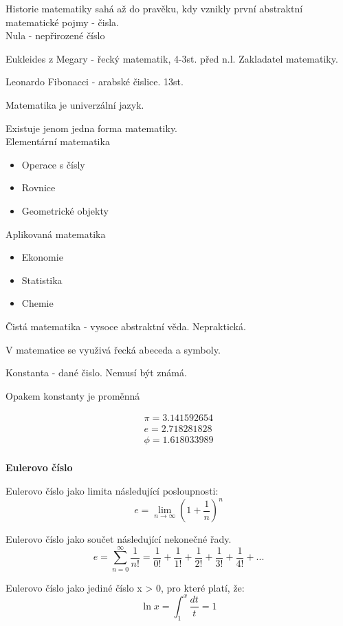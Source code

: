 \documentclass[a4paper,12pt]{article}
\begin{document}
Historie matematiky sahá až do pravěku, kdy vznikly první abstraktní 
matematické pojmy - čisla. \\

Nula - nepřirozené číslo

Eukleides z Megary - řecký matematik, 4-3st. před n.l. Zakladatel matematiky.

Leonardo Fibonacci - arabské čislice. 13st.

Matematika je univerzální jazyk.

Existuje jenom jedna forma matematiky. \\

Elementární matematika
\begin{itemize}
	\item Operace s čísly
	\item Rovnice
	\item Geometrické objekty \\
\end{itemize}

Aplikovaná matematika
\begin{itemize}
	\item Ekonomie
	\item Statistika
	\item Chemie \\
\end{itemize}

Čistá matematika - vysoce abstraktní věda. Nepraktická.

V matematice se využivá řecká abeceda a symboly.

Konstanta - dané čislo. Nemusí být známá.

Opakem konstanty je proměnná

\begin{align*}
\pi = 3.141592654 \\
e = 2.718281828 \\
\phi = 1.618033989 \\
\end{align*}

\newpage
\textbf{Eulerovo číslo}

Eulerovo číslo jako limita následující posloupnosti:
\[
	e = \lim_{n\to\infty} \left(1 + \frac{1}{n} \right)^n
\]

Eulerovo číslo jako součet následující nekonečné řady.
\[
e = \sum_{n=0}^{\infty} \frac{1}{n!} = \frac{1}{0!} + \frac{1}{1!} + \frac{1}{2!} + \frac{1}{3!} + \frac{1}{4!} + ...
\]

Eulerovo číslo jako jediné číslo x > 0, pro které platí, že:
\[
\ln x = \displaystyle\int_{1}^{x} \frac{dt}{t} = 1
\]
\end{document}
